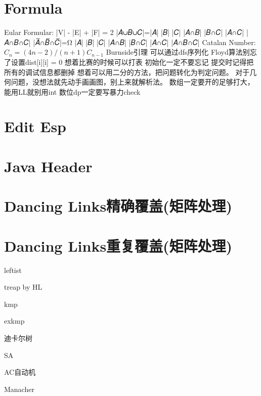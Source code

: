 \documentclass[
	10pt,
	twocolumn,
	a4paper,
]{article}
\begin{document}
\section{Formula}
Eular Formular: |V| - |E| + |F| = 2
|𝐴∪𝐵∪𝐶|=|𝐴| |𝐵| |𝐶| |𝐴∩𝐵| |𝐵∩𝐶| |𝐴∩𝐶| |𝐴∩𝐵∩𝐶|
|𝐴̅∩𝐵̅∩𝐶̅|=Ω |𝐴| |𝐵| |𝐶| |𝐴∩𝐵| |𝐵∩𝐶| |𝐴∩𝐶| |𝐴∩𝐵∩𝐶|
Catalan Number: $C_n = (4n-2) / (n+1) C_{n-1}$
Burnside引理
可以通过dfs序列化
Floyd算法别忘了设置dist[i][i] = 0
想着比赛的时候可以打表
初始化一定不要忘记
提交时记得把所有的调试信息都删掉
想着可以用二分的方法，把问题转化为判定问题。
对于几何问题，没想法就先动手画画图，别上来就解析法。
数组一定要开的足够打大，能用LL就别用int
数位dp一定要写暴力check

\section{Edit Esp}

\section{Java Header}

\section{Dancing Links精确覆盖(矩阵处理)}

\section{Dancing Links重复覆盖(矩阵处理)}


leftist

treap by HL

kmp

exkmp

迪卡尔树

SA

AC自动机

Manacher
\end{document}
